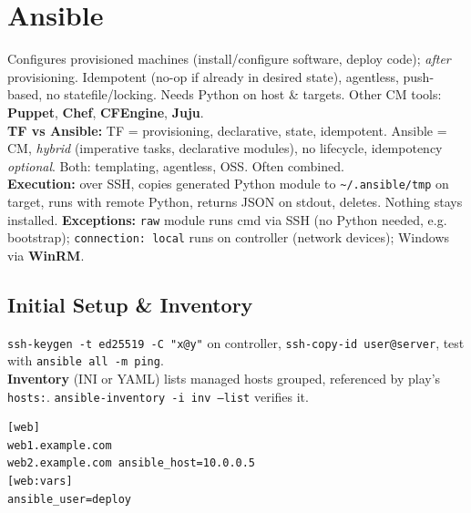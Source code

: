 \section{Ansible}
Configures provisioned machines (install/configure software, deploy code); \textit{after} provisioning. Idempotent (no-op if already in desired state), agentless, push-based, no statefile/locking. Needs Python on host \& targets. Other CM tools: \textbf{Puppet}, \textbf{Chef}, \textbf{CFEngine}, \textbf{Juju}. \\
\textbf{TF vs Ansible:} TF = provisioning, declarative, state, idempotent. Ansible = CM, \textit{hybrid} (imperative tasks, declarative modules), no lifecycle, idempotency \textit{optional}. Both: templating, agentless, OSS. Often combined.\\
\textbf{Execution:} over SSH, copies generated Python module to \texttt{\textasciitilde/.ansible/tmp} on target, runs with remote Python, returns JSON on stdout, deletes. Nothing stays installed. \textbf{Exceptions:} \texttt{raw} module runs cmd via SSH (no Python needed, e.g. bootstrap); \texttt{connection: local} runs on controller (network devices); Windows via \textbf{WinRM}.
\subsection{Initial Setup \& Inventory}
\texttt{ssh-keygen -t ed25519 -C "x@y"} on controller, \texttt{ssh-copy-id user@server}, test with \texttt{ansible all -m ping}. \\
\textbf{Inventory} (INI or YAML) lists managed hosts grouped, referenced by play's \texttt{hosts:}. \texttt{ansible-inventory -i inv --list} verifies it.
\begin{lstlisting}
[web]
web1.example.com
web2.example.com ansible_host=10.0.0.5
[web:vars]
ansible_user=deploy
\end{lstlisting}
